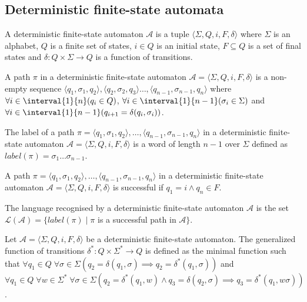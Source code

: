 \subsection{Deterministic finite-state automata}

\begin{definition}
	A deterministic finite-state automaton $\mathcal{A}$ is a tuple $\langle \Sigma, Q, i, F, \delta \rangle$ where $\Sigma$ is an alphabet, $Q$ is a finite set of states, $i \in Q$ is an initial state, $F \subseteq Q$ is a set of final states and $\delta : Q \times \Sigma \rightarrow Q$ is a function of transitions.
\end{definition}

\begin{definition}
	A path $\pi$ in a deterministic finite-state automaton $\mathcal{A} = \langle \Sigma, Q, i, F, \delta \rangle$ is a non-empty sequence $\langle q_1, \sigma_1, q_2 \rangle, \langle q_2, \sigma_2, q_3 \rangle \dots, \langle q_{n-1}, \sigma_{n-1}, q_n \rangle$ where $\forall i \in \interval{1}{n}(q_i \in Q)$, $\forall i \in \interval{1}{n-1}(\sigma_i \in \Sigma)$ and $\forall i \in \interval{1}{n-1}(q_{i+1} = \delta(q_i, \sigma_i))$.
\end{definition}

\begin{definition}
	The label of a path $\pi = \langle q_1, \sigma_1, q_2 \rangle, \dots, \langle q_{n-1}, \sigma_{n-1}, q_n \rangle$ in a deterministic finite-state automaton $\mathcal{A} = \langle \Sigma, Q, i, F, \delta \rangle$ is a word of length $n-1$ over $\Sigma$ defined as $label(\pi) = \sigma_1 \dots \sigma_{n-1}$.
\end{definition}

\begin{definition}
	A path $\pi = \langle q_1, \sigma_1, q_2 \rangle, \dots, \langle q_{n-1}, \sigma_{n-1}, q_n \rangle$ in a deterministic finite-state automaton $\mathcal{A} = \langle \Sigma, Q, i, F, \delta \rangle$ is successful if $q_1 = i \land q_n \in F$.
\end{definition}

\begin{definition}
	The language recognised by a deterministic finite-state automaton $\mathcal{A}$ is the set $\mathcal{L}(\mathcal{A}) = \{ label(\pi) \mid \pi$ is a successful path in $\mathcal{A} \}$.
\end{definition}

\begin{definition}
	Let $\mathcal{A} = \langle \Sigma, Q, i, F, \delta \rangle$ be a deterministic finite-state automaton. The generalized function of transitions $\delta^* : Q \times \Sigma^* \rightarrow Q$ is defined as the minimal function such that $\forall q_1 \in Q\; \forall \sigma \in \Sigma(q_2 = \delta(q_1, \sigma) \implies q_2 = \delta^*(q_1, \sigma))$ and $\forall q_1 \in Q\; \forall w \in \Sigma^*\; \forall \sigma \in \Sigma(q_2 = \delta^*(q_1, w) \land q_3 = \delta(q_2, \sigma) \implies q_3 = \delta^*(q_1, w\sigma))$.
\end{definition}

